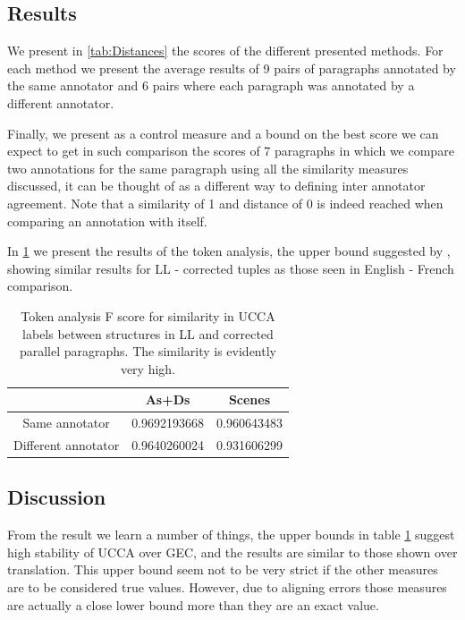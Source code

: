 \documentclass[english]{article}
\begin{document}
	\subsection{Results}
	
	We present in \ref{tab:Distances} the scores of the different presented
	methods. For each method we present the average results of 9 pairs
	of paragraphs annotated by the same annotator and 6 pairs where each
	paragraph was annotated by a different annotator.
	
	Finally, we present as a control measure and a bound on the best score
	we can expect to get in such comparison the scores of 7 paragraphs
	in which we compare two annotations for the same paragraph using all
	the similarity measures discussed, it can be thought of as a different
	way to defining inter annotator agreement. Note that a similarity
	of 1 and distance of 0 is indeed reached when comparing an annotation with itself.
	
	In \ref{tab:Token_analysis} we present the results of the token analysis, the
	upper bound suggested by \cite{sulem2015conceptual}, showing similar
	results for LL - corrected tuples as those seen in English
	- French comparison.
		
		\begin{table}[h!]
			\centering
			\label{tab:Token_analysis}
			\begin{tabular}{c|c|c}
				& As+Ds & Scenes\\
				\hline
				Same annotator & 0.9692193668 & 0.960643483\\
				Different annotator & 0.9640260024
				 & 0.931606299
				 \\
				\end{tabular}
				\caption{Token analysis F score for similarity in UCCA labels between structures in LL and corrected parallel paragraphs. The similarity is evidently very high.}
				\end{table}
				
	\subsection{Discussion}
	
	From the result we learn a number of things, the upper
	bounds in table \ref{tab:Token_analysis} suggest high stability of UCCA over GEC, and the results are similar to those shown over
	translation. This upper bound seem not to be very strict if the other
	measures are to be considered true values. 
	However, due to aligning errors those measures are actually a close lower bound more than they are an exact value.
	
\end{document}
